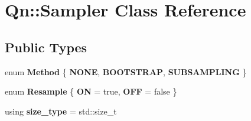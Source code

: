 \hypertarget{classQn_1_1Sampler}{}\section{Qn\+:\+:Sampler Class Reference}
\label{classQn_1_1Sampler}
\subsection*{Public Types}
\begin{DoxyCompactItemize}
\item 
\mbox{\label{classQn_1_1Sampler_acfcaba7b9132b1c31bccfb570b990564}} 
enum {\bfseries Method} \{ {\bfseries N\+O\+NE}, 
{\bfseries B\+O\+O\+T\+S\+T\+R\+AP}, 
{\bfseries S\+U\+B\+S\+A\+M\+P\+L\+I\+NG}
 \}
\item 
\mbox{\label{classQn_1_1Sampler_a57358caeddbfa3dfdff9bd8c4a4a2a9c}} 
enum {\bfseries Resample} \{ {\bfseries ON} = true, 
{\bfseries O\+FF} = false
 \}
\item 
\mbox{\label{classQn_1_1Sampler_a110060afda3bf22b610943a67d62635c}} 
using {\bfseries size\+\_\+type} = std\+::size\+\_\+t
\end{DoxyCompactItemize}
